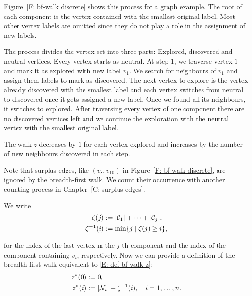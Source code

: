 Figure~\ref{F: bf-walk discrete} shows this process for a graph example.
The root of each component is the vertex contained with the smallest original label.
Most other vertex labels are omitted since they do not play a role in the assignment of new labels.

The process divides the vertex set into three parts: 
Explored, discovered and neutral vertices. Every vertex starts as neutral.
At step $1$, we traverse vertex $1$ and mark it as explored with new label $v_1$.
We search for neighbours of $v_1$ and assign them labels to mark as discovered.
The next vertex to explore is the vertex already discovered with the smallest label
and each vertex switches from neutral to discovered once it gets assigned a new label.
Once we found all its neighbours, it switches to explored.
After traversing every vertex of one component
there are no discovered vertices left and we continue the exploration with the neutral vertex with the smallest original label.

The walk $z$ decreases by $1$ for each vertex explored
and increases by the number of new neighbours discovered in each step.

Note that surplus edges, like $(v_8, v_{10})$ in Figure~\ref{F: bf-walk discrete}, are ignored by the breadth-first walk.
We count their occurrence with another counting process in Chapter~\ref{C: surplus edges}.





We write
\begin{align}
\zeta(j) &:= |\mathcal{C}_{1}| + \dots + |\mathcal{C}_{j}|, \label{E: zeta}\\ 
\zeta^{-1}(i) &:= \min \{ j \; | \; \zeta(j) \geq i \}, \label{E: zeta-1}
\end{align}

for the index of the last vertex in the $j$-th component and the index of the component containing $v_i$,
respectively.
Now we can provide a definition of the breadth-first walk equivalent to \eqref{E: def bf-walk z}:
\begin{equation}  \label{E: def bf-walk z*}
\begin{aligned}
z^*(0) &:= 0, \\
z^*(i) &:= |\mathcal{N}_{i}| - \zeta^{-1}(i), \quad i=1, \dots , n.
\end{aligned}
\end{equation}

